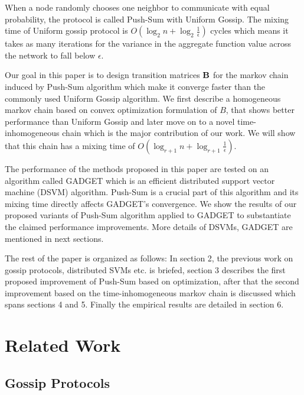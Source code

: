 \documentclass{article}
\begin{document}
When a node randomly chooses one neighbor to communicate with equal probability, the protocol is called Push-Sum with Uniform Gossip. The mixing time of Uniform gossip protocol is  $O(\log_2 n + \log_2 \frac{1}{\epsilon})$ cycles  which means it takes as many iterations for the variance in the aggregate function value across the network to fall below $\epsilon$.

Our goal in this paper is to design transition matrices $\bf B$ for the markov chain induced by Push-Sum algorithm which make it converge faster than the commonly used Uniform Gossip algorithm. We first describe a homogeneous markov chain based on convex optimization formulation of $B$, that shows better performance than Uniform Gossip and later move on to a novel time-inhomogeneous chain which is the major contribution of our work. We will show that this chain has a mixing time of $O(\log_{r+1} n + \log_{r+1} \frac{1}{\epsilon})$.

The performance of the methods proposed in this paper are tested on an algorithm called GADGET \citep{Hensel_gadgetsvm} which is an efficient distributed support vector machine (DSVM) algorithm. Push-Sum is a crucial part of this algorithm and its mixing time directly affects GADGET's convergence. We show the results of our proposed variants of Push-Sum algorithm applied to GADGET to substantiate the claimed performance improvements. More details of DSVMs, GADGET are mentioned in next sections.

The rest of the paper is organized as follows: In section 2, the previous work on gossip protocols, distributed SVMs etc. is briefed, section 3 describes the first proposed improvement of Push-Sum based on optimization, after that the second improvement based on the time-inhomogeneous markov chain is discussed which spans sections 4 and 5. Finally the empirical results are detailed in section 6.

\section{Related Work}

\subsection{Gossip Protocols}
\end{document}
